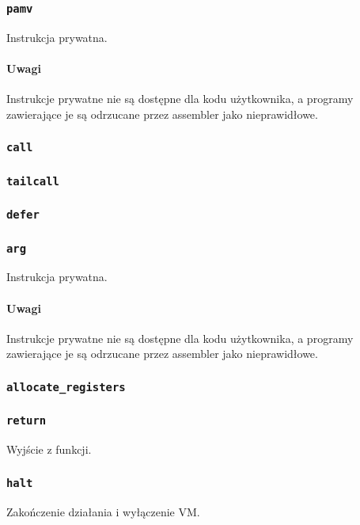 \subsubsection{\texttt{pamv}}

Instrukcja prywatna.

\paragraph*{Uwagi}

Instrukcje prywatne nie są dostępne dla kodu użytkownika, a programy zawierające
je są odrzucane przez assembler jako nieprawidłowe.

\subsubsection{\texttt{call}}
\subsubsection{\texttt{tailcall}}
\subsubsection{\texttt{defer}}
\subsubsection{\texttt{arg}}

Instrukcja prywatna.

\paragraph*{Uwagi}

Instrukcje prywatne nie są dostępne dla kodu użytkownika, a programy zawierające
je są odrzucane przez assembler jako nieprawidłowe.

\subsubsection{\texttt{allocate\_registers}}

\subsubsection{\texttt{return}}

Wyjście z funkcji.

\subsubsection{\texttt{halt}}

Zakończenie działania i wyłączenie VM.
